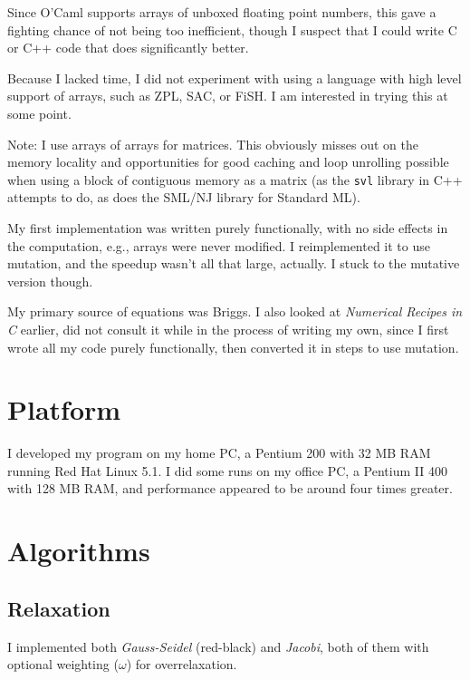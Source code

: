 \documentclass[titlepage,twoside]{article}
\begin{document}
Since O'Caml supports arrays of unboxed floating point numbers, this
gave a fighting chance of not being too inefficient, though I suspect
that I could write C or C++ code that does significantly better.

Because I lacked time, I did not experiment with using a language with
high level support of arrays, such as ZPL, SAC, or FiSH.  I am
interested in trying this at some point.

Note: I use arrays of arrays for matrices.  This obviously misses out
on the memory locality and opportunities for good caching and loop
unrolling possible when using a block of contiguous memory as a
matrix (as the \texttt{svl} library in C++ attempts to do, as does the
SML/NJ library for Standard ML).

My first implementation was written purely functionally, with no side
effects in the computation, e.g., arrays were never modified.  I
reimplemented it to use mutation, and the speedup wasn't all that
large, actually.  I stuck to the mutative version though.

My primary source of equations was Briggs.  I also looked at
\emph{Numerical Recipes in C} earlier, did not consult it while in the
process of writing my own, since I first wrote all my code purely
functionally, then converted it in steps to use mutation.



\clearpage
\section{Platform}
\label{sec:platform}

I developed my program on my home PC, a Pentium 200 with 32 MB RAM
running Red Hat Linux 5.1.  I did some runs on my office PC, a Pentium
II 400 with 128 MB RAM, and performance appeared to be around four
times greater.



\clearpage
\section{Algorithms}

\subsection{Relaxation}
\label{sec:relaxation}

I implemented both \emph{Gauss-Seidel} (red-black) and \emph{Jacobi},
both of them with optional weighting ($\omega$) for overrelaxation.
\end{document}
